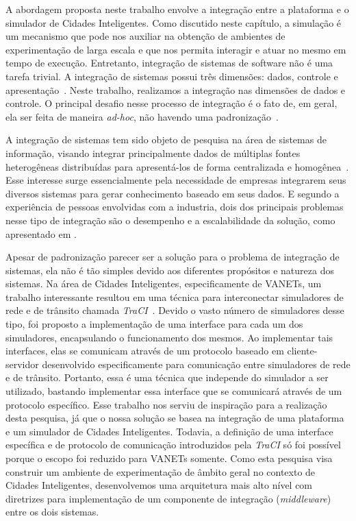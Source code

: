 
A abordagem proposta neste trabalho envolve a integração entre a plataforma e o simulador de Cidades Inteligentes.
Como discutido neste capítulo, a simulação é um mecanismo que pode nos auxiliar na obtenção de ambientes de experimentação de larga escala e que nos permita interagir e atuar no mesmo em tempo de execução.
Entretanto, integração de sistemas de software não é uma tarefa trivial.
A integração de sistemas possui três dimensões: dados, controle e apresentação~\cite{wasserman_1990}.
Neste trabalho, realizamos a integração nas dimensões de dados e controle.
O principal desafio nesse processo de integração é o fato de, em geral, ela ser feita de maneira \textit{ad-hoc}, não havendo uma padronização~\cite{wasserman_1990}.

A integração de sistemas tem sido objeto de pesquisa na área de sistemas de informação, visando integrar principalmente dados de múltiplas fontes heterogêneas distribuídas para apresentá-los de forma
centralizada e homogênea~\cite{genesereth_1997}.
Esse interesse surge essencialmente pela necessidade de empresas integrarem seus diversos sistemas para gerar conhecimento baseado em seus dados.
E segundo a experiência de pessoas envolvidas com a industria, dois dos principais problemas nesse tipo de integração são o desempenho e a escalabilidade da solução, como apresentado em \cite{halevy_2005}.

Apesar de padronização parecer ser a solução para o problema de integração de sistemas, ela não é tão simples devido aos diferentes propósitos e natureza dos sistemas.
Na área de Cidades Inteligentes, especificamente de VANETs, um trabalho interessante resultou em uma técnica para interconectar simuladores de rede e de trânsito chamada \textit{TraCI}~\cite{wegener_2008}.
Devido o vasto número de simuladores desse tipo, foi proposto a implementação de uma interface para cada um dos simuladores, encapsulando o funcionamento dos mesmos.
Ao implementar tais interfaces, elas se comunicam através de um protocolo baseado em cliente-servidor desenvolvido especificamente para comunicação entre simuladores de rede e de trânsito.
Portanto, essa é uma técnica que independe do simulador a ser utilizado, bastando implementar essa interface que se comunicará através de um protocolo específico.
Esse trabalho nos serviu de inspiração para a realização desta pesquisa, já que o nossa solução se basea na integração de uma plataforma e um simulador de Cidades Inteligentes.
Todavia, a definição de uma interface específica e de protocolo de comunicação introduzidos pela \textit{TraCI} só foi possível porque o escopo foi reduzido para VANETs somente.
Como esta pesquisa visa construir um ambiente de experimentação de âmbito geral no contexto de Cidades Inteligentes, desenvolvemos uma arquitetura mais alto nível com diretrizes para implementação de um
componente de integração (\textit{middleware}) entre os dois sistemas.

